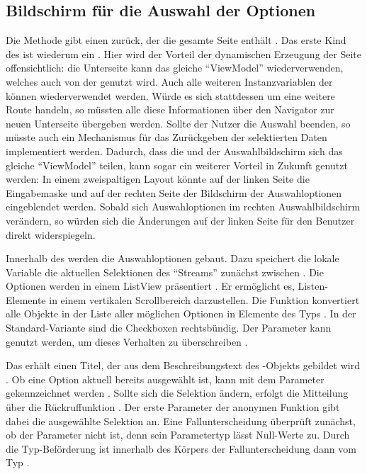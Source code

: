 \subsection{Bildschirm für die Auswahl der Optionen}

 
Die Methode  \Lst{\ref{lst:Schritt1FunktionCreateMultipleChoiceSelectionScreen}} gibt einen  zurück, der die gesamte Seite enthält .
Das erste Kind des  ist wiederum ein  .
Hier wird der Vorteil der dynamischen Erzeugung der Seite offensichtlich: die Unterseite kann das gleiche \enquote{ViewModel} wiederverwenden, welches auch von der  genutzt wird.
Auch alle weiteren Instanzvariablen der  können wiederverwendet werden.
Würde es sich stattdessen um eine weitere Route handeln, so müssten alle diese Informationen über den Navigator zur neuen Unterseite übergeben werden.
Sollte der Nutzer die Auswahl beenden, so müsste auch ein Mechanismus für das Zurückgeben der selektierten Daten implementiert werden.
Dadurch, dass die  und der Auswahlbildschirm sich das gleiche \enquote{ViewModel} teilen,
kann sogar ein weiterer Vorteil in Zukunft genutzt werden:
In einem zweispaltigen Layout könnte auf der linken Seite die Eingabemaske und auf der rechten Seite der Bildschirm der Auswahloptionen eingeblendet werden.
Sobald sich Auswahloptionen im rechten Auswahlbildschirm verändern, so würden sich die Änderungen auf der linken Seite für den Benutzer direkt widerspiegeln.

Innerhalb des  werden die Auswahloptionen gebaut.
Dazu speichert die lokale Variable  die aktuellen Selektionen des \enquote{Streams} zunächst zwischen .
Die Optionen werden in einem ListView präsentiert .
Er ermöglicht es, Listen-Elemente in einem vertikalen Scrollbereich darzustellen.
Die Funktion  konvertiert alle Objekte in der Liste aller möglichen Optionen  in Elemente des Typs  .
In der Standard-Variante sind die Checkboxen rechtsbündig.
Der Parameter  kann genutzt werden, um dieses Verhalten zu überschreiben .

Das  erhält einen Titel, der aus dem Beschreibungstext  des -Objekts gebildet wird .
Ob eine Option aktuell bereits ausgewählt ist, kann mit dem Parameter  gekennzeichnet werden .
Sollte sich die Selektion ändern, erfolgt die Mitteilung über die Rückruffunktion  .
Der erste Parameter der anonymen Funktion gibt dabei die ausgewählte Selektion an.
Eine Fallunterscheidung überprüft zunächst, ob der Parameter  nicht  ist, denn sein Parametertyp  lässt Null-Werte zu.
Durch die Typ-Beförderung ist  innerhalb des Körpers der Fallunterscheidung dann vom Typ  . 


